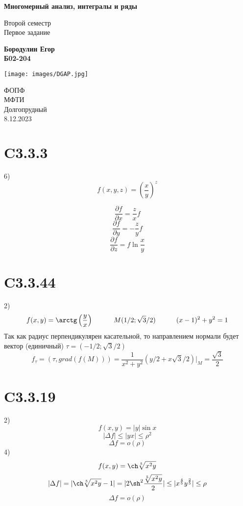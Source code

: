 \documentclass[a4paper,12pt]{article} %
\begin{document}
\begin{titlepage}
    \begin{center}
        \vspace*{1cm}
            
        \Huge
        \textbf{Многомерный анализ, интегралы и ряды}
            
        \vspace{0.5cm}
        \LARGE
        Второй семестр\\
        Первое задание
            
        \vspace{1.5cm}
            
        \textbf{Бородулин Егор \\ Б02-204}
        
        \vfill
        
        \texttt{[image: images/DGAP.jpg]}
        
        \vspace{0.8cm}
            
        \Large
        ФОПФ\\
        МФТИ\\
        Долгопрудный\\
        8.12.2023
            
    \end{center}
\end{titlepage}
\section*{C3.3.3}6)
$$f(x,y,z)=\left(\frac{x}{y}\right)^{z}$$
\begin{multicols}{3}
$$\frac{\partial f}{\partial x}=\frac{z}{x}f$$
$$\frac{\partial f}{\partial y}=-\frac{z}{y}f$$
$$\frac{\partial f}{\partial z}=f\ln \frac{x}{y}$$
\end{multicols}
\section*{C3.3.44}2)
$$f(x,y)=\arctg\left(\frac{y}{x}\right)\quad\quad\quad M(1/2;\sqrt{3}/2)\quad\quad\quad (x-1)^2+y^2=1$$
Так как радиус перпендикулярен касательной, то направлением нормали будет вектор (единичный) $\tau = (-1/2;\sqrt{3}/2)$
$$f_{\tau}=(\tau,grad(f(M)))=\frac{1}{x^2+y^2}(y/2+x\sqrt{3}/2)|_{M}=\frac{\sqrt{3}}{2}$$
\section*{C3.3.19}2)
$$f(x,y)=|y|\sin x$$
$$|\Delta f|\le|yx|\leq\rho^2$$
$$\Delta f=o(\rho)$$
4)$$f(x,y)=\ch\sqrt[5]{x^2y}$$
$$|\Delta f|=|\ch\sqrt[5]{x^2y}-1|=|2\sh^2\frac{\sqrt[5]{x^2y}}{2}|\le|x^{\frac{4}{5}}y^{\frac{2}{5}}|\le\rho$$
$$\Delta f=o(\rho)$$
\end{document}
